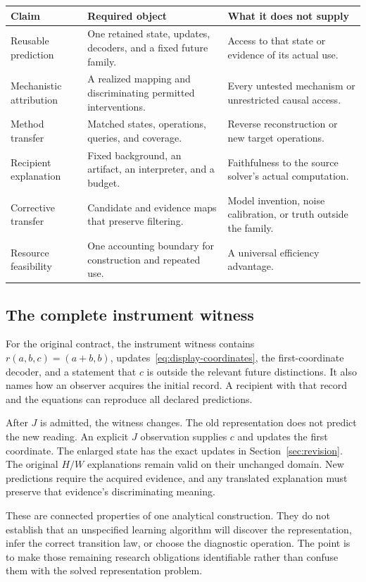 \documentclass[11pt,letterpaper]{article}
\theoremstyle{plain}
\theoremstyle{definition}
\begin{document}
\begin{center}\small
\begin{tabularx}{\textwidth}{@{}P{1.35in}XX@{}}\toprule
Claim & Required object & What it does not supply\\\midrule
Reusable prediction & One retained state, updates, decoders, and a fixed future family. & Access to that state or evidence of its actual use.\\
Mechanistic attribution & A realized mapping and discriminating permitted interventions. & Every untested mechanism or unrestricted causal access.\\
Method transfer & Matched states, operations, queries, and coverage. & Reverse reconstruction or new target operations.\\
Recipient explanation & Fixed background, an artifact, an interpreter, and a budget. & Faithfulness to the source solver's actual computation.\\
Corrective transfer & Candidate and evidence maps that preserve filtering. & Model invention, noise calibration, or truth outside the family.\\
Resource feasibility & One accounting boundary for construction and repeated use. & A universal efficiency advantage.\\\bottomrule
\end{tabularx}\end{center}

\subsection{The complete instrument witness}
For the original contract, the instrument witness contains $r(a,b,c)=(a+b,b)$, updates~\eqref{eq:display-coordinates}, the first-coordinate decoder, and a statement that $c$ is outside the relevant future distinctions. It also names how an observer acquires the initial record. A recipient with that record and the equations can reproduce all declared predictions.

After $J$ is admitted, the witness changes. The old representation does not predict the new reading. An explicit $J$ observation supplies $c$ and updates the first coordinate. The enlarged state has the exact updates in Section~\ref{sec:revision}. The original $H/W$ explanations remain valid on their unchanged domain. New predictions require the acquired evidence, and any translated explanation must preserve that evidence's discriminating meaning.

These are connected properties of one analytical construction. They do not establish that an unspecified learning algorithm will discover the representation, infer the correct transition law, or choose the diagnostic operation. The point is to make those remaining research obligations identifiable rather than confuse them with the solved representation problem.
\end{document}
